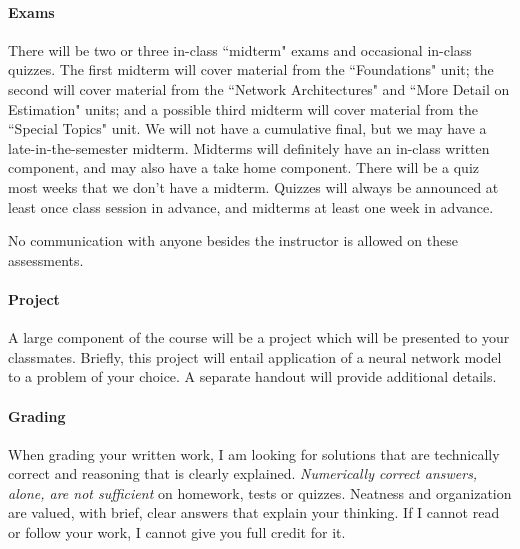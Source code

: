 \documentclass[11pt]{article}
\begin{document}
\paragraph{Exams}
There will be two or three in-class ``midterm" exams and occasional in-class quizzes.
The first midterm will cover material from the ``Foundations" unit; the second will cover material from the ``Network Architectures" and ``More Detail on Estimation" units; and a possible third midterm will cover material from the ``Special Topics" unit.
We will not have a cumulative final, but we may have a late-in-the-semester midterm.
Midterms will definitely have an in-class written component, and may also have a take home component.
There will be a quiz most weeks that we don't have a midterm.
Quizzes will always be announced at least once class session in advance, and midterms at least one week in advance.

No communication with anyone besides the instructor is allowed on these assessments.

\paragraph{Project}
A large component of the course will be a project which will be presented to your classmates.
Briefly, this project will entail application of a neural network model to a problem of your choice.
A separate handout will provide additional details.

\paragraph{Grading}
When grading your written work, I am looking for solutions that are technically correct and reasoning that is clearly explained.  \emph{Numerically correct answers, alone, are not sufficient} on homework, tests or quizzes.  Neatness and organization are valued, with brief, clear answers that explain your thinking.  If I cannot read or follow your work, I cannot give you full credit for it.
\end{document}

